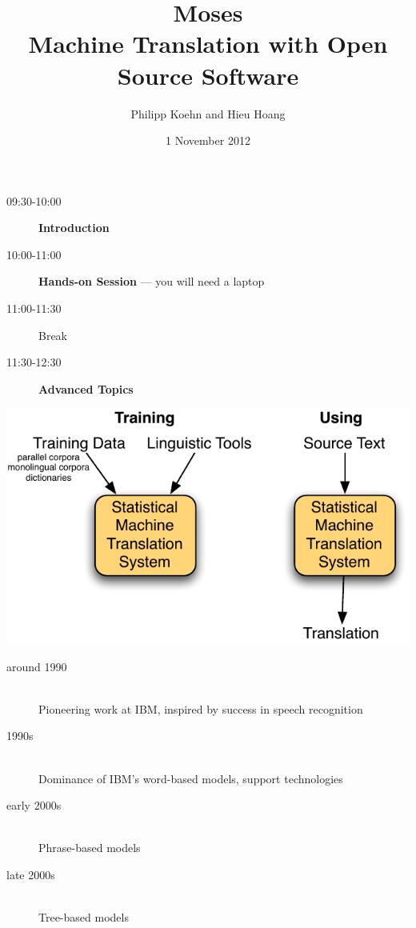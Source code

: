 \documentclass[landscape]{uedslides2C}
\begin{document}
\title[Machine Translation with Open Source Software]{{\sc \huge Moses}\\[3mm] Machine Translation with Open Source Software}
\author[Koehn and Hoang]{Philipp Koehn  and Hieu Hoang}
\date{\vspace{-5mm}1 November 2012}
\maketitle


\vspace{20mm}
\begin{description}
\item[\small 09:30-10:00 $\;\;$] {\bf Introduction}
\item[\small 10:00-11:00 $\;\;$] {\bf Hands-on Session} --- you will need a laptop
\item[\small 11:00-11:30 $\;\;$] Break
\item[\small 11:30-12:30 $\;\;$] {\bf Advanced Topics}
\end{description}


\vspace{15mm}
\begin{center}
\includegraphics[scale=1.8]{basics.pdf}
\end{center}


\vspace{10mm}
\begin{description}
\item[around 1990] $\;$\\[2mm] Pioneering work at IBM, inspired by success in speech recognition
\item[1990s] $\;$\\[2mm] Dominance of IBM's word-based models, support technologies
\item[early 2000s] $\;$\\[2mm] Phrase-based models
\item[late 2000s] $\;$\\[2mm] Tree-based models
\end{description}
\end{document}
